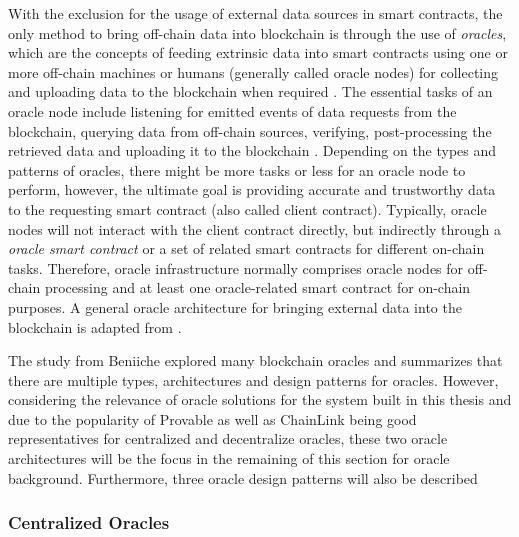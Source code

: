 With the exclusion for the usage of external data sources in smart contracts, the only method to bring off-chain data into blockchain is through the use of \textit{oracles}, which are the concepts of feeding extrinsic data into smart contracts using one or more off-chain machines or humans (generally called oracle nodes) for collecting and uploading data to the blockchain when required \cite{caldarelli2020understanding}. The essential tasks of an oracle node include listening for emitted events of data requests from the blockchain, querying data from off-chain sources, verifying, post-processing the retrieved data and uploading it to the blockchain \cite{beniiche2020study}. Depending on the types and patterns of oracles, there might be more tasks or less for an oracle node to perform, however, the ultimate goal is providing accurate and trustworthy data to the requesting smart contract (also called client contract). Typically, oracle nodes will not interact with the client contract directly, but indirectly through a \textit{oracle smart contract} or a set of related smart contracts for different on-chain tasks. Therefore, oracle infrastructure normally comprises oracle nodes for off-chain processing and at least one oracle-related smart contract for on-chain purposes. A general oracle architecture for bringing external data into the blockchain is adapted from \cite{beniiche2020study}.


The study from Beniiche \cite{beniiche2020study} explored many blockchain oracles and summarizes that there are multiple types, architectures and design patterns for oracles. However, considering the relevance of oracle solutions for the system built in this thesis and due to the popularity of Provable \cite{team2019scalable} as well as ChainLink \cite{breidenbach2021chainlink} being good representatives for centralized and decentralize oracles, these two oracle architectures will be the focus in the remaining of this section for oracle background. Furthermore, three oracle design patterns will also be described

\subsubsection{Centralized Oracles}



